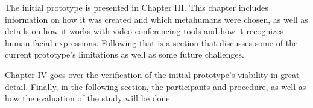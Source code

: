 The initial prototype is presented in Chapter III. This chapter includes information on how it was created and which metahumans were chosen, as well as details on how it works with video conferencing tools and how it recognizes human facial expressions. Following that is a section that discusses some of the current prototype's limitations as well as some future challenges.

Chapter IV goes over the verification of the initial prototype's viability in great detail. Finally, in the following section, the participants and procedure, as well as how the evaluation of the study will be done.